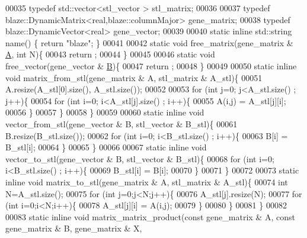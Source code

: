 \begin{DoxyCode}
00035   \textcolor{keyword}{typedef} std::vector<stl\_vector > stl\_matrix;
00036 
00037   \textcolor{keyword}{typedef} blaze::DynamicMatrix<real,blaze::columnMajor>  gene\_matrix;
00038   \textcolor{keyword}{typedef} blaze::DynamicVector<real>  gene\_vector;
00039 
00040   \textcolor{keyword}{static} \textcolor{keyword}{inline} std::string name() \{ \textcolor{keywordflow}{return} \textcolor{stringliteral}{"blaze"}; \}
00041 
00042   \textcolor{keyword}{static} \textcolor{keywordtype}{void} free\_matrix(gene\_matrix & \hyperlink{group___core___module_class_eigen_1_1_matrix}{A}, \textcolor{keywordtype}{int} N)\{
00043     return ;
00044   \}
00045 
00046   \textcolor{keyword}{static} \textcolor{keywordtype}{void} free\_vector(gene\_vector & \hyperlink{group___core___module_class_eigen_1_1_matrix}{B})\{
00047     return ;
00048   \}
00049 
00050   \textcolor{keyword}{static} \textcolor{keyword}{inline} \textcolor{keywordtype}{void} matrix\_from\_stl(gene\_matrix & A, stl\_matrix & A\_stl)\{
00051     A.resize(A\_stl[0].size(), A\_stl.size());
00052 
00053     \textcolor{keywordflow}{for} (\textcolor{keywordtype}{int} j=0; j<A\_stl.size() ; j++)\{
00054       \textcolor{keywordflow}{for} (\textcolor{keywordtype}{int} i=0; i<A\_stl[j].size() ; i++)\{
00055         A(i,j) = A\_stl[j][i];
00056       \}
00057     \}
00058   \}
00059 
00060   \textcolor{keyword}{static} \textcolor{keyword}{inline} \textcolor{keywordtype}{void} vector\_from\_stl(gene\_vector & B, stl\_vector & B\_stl)\{
00061     B.resize(B\_stl.size());
00062     \textcolor{keywordflow}{for} (\textcolor{keywordtype}{int} i=0; i<B\_stl.size() ; i++)\{
00063       B[i] = B\_stl[i];
00064     \}
00065   \}
00066 
00067   \textcolor{keyword}{static} \textcolor{keyword}{inline} \textcolor{keywordtype}{void} vector\_to\_stl(gene\_vector & B, stl\_vector & B\_stl)\{
00068     \textcolor{keywordflow}{for} (\textcolor{keywordtype}{int} i=0; i<B\_stl.size() ; i++)\{
00069       B\_stl[i] = B[i];
00070     \}
00071   \}
00072 
00073   \textcolor{keyword}{static} \textcolor{keyword}{inline} \textcolor{keywordtype}{void} matrix\_to\_stl(gene\_matrix & A, stl\_matrix & A\_stl)\{
00074     \textcolor{keywordtype}{int} N=A\_stl.size();
00075     \textcolor{keywordflow}{for} (\textcolor{keywordtype}{int} j=0;j<N;j++)\{
00076       A\_stl[j].resize(N);
00077       \textcolor{keywordflow}{for} (\textcolor{keywordtype}{int} i=0;i<N;i++)\{
00078         A\_stl[j][i] = A(i,j);
00079       \}
00080     \}
00081   \}
00082 
00083   \textcolor{keyword}{static} \textcolor{keyword}{inline} \textcolor{keywordtype}{void} matrix\_matrix\_product(\textcolor{keyword}{const} gene\_matrix & A, \textcolor{keyword}{const} gene\_matrix & B, gene\_matrix & X, \textcolor{keywordtype}{
}
\end{DoxyCode}

